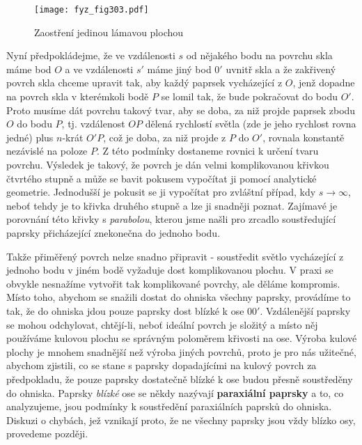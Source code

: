 {    \begin{figure}[ht!] %
      \centering
      \texttt{[image: fyz\_fig303.pdf]}
      \caption{Zaostření jedinou lámavou plochou
               \cite[s.~358]{Feynman01}}
      \label{fyz:fig303}  
    \end{figure}
    
    Nyní předpokládejme, že ve vzdálenosti \(s\) od nějakého bodu na povrchu skla máme bod \(O\) a 
    ve vzdálenosti \(s'\) máme jiný bod \(0'\) uvnitř skla a že zakřivený povrch skla chceme 
    upravit tak, aby každý paprsek vycházející z \(O\), jenž dopadne na povrch skla v kterémkoli 
    bodě \(P\) se lomil tak, že bude pokračovat do bodu \(O'\). Proto musíme dát povrchu takový 
    tvar, aby se doba, za niž projde paprsek zbodu \(O\) do bodu \(P\), tj. vzdálenost \(OP\) 
    dělená rychlostí světla (zde je jeho rychlost rovna jedné) plus \(n\)-krát \(O'P\), což je 
    doba, za niž projde z \(P\) do \(O'\), rovnala konstantě nezávislé na poloze \(P\). Z této 
    podmínky dostaneme rovnici k určení tvaru povrchu. Výsledek je takový, že povrch je dán velmi 
    komplikovanou křivkou čtvrtého stupně a může se bavit pokusem vypočítat ji pomocí analytické 
    geometrie. Jednodušší je pokusit se ji vypočítat pro zvláštní případ, kdy 
    \(s\rightarrow\infty\), neboť tehdy je to křivka druhého stupně a lze ji snadněji poznat. 
    Zajímavé je porovnání této křivky s \emph{parabolou}, kterou jsme našli pro zrcadlo 
    soustředující paprsky přicházející znekonečna do jednoho bodu.
    
    Takže přiměřený povrch nelze snadno připravit - soustředit světlo vycházející z jednoho bodu v 
    jiném bodě vyžaduje dost komplikovanou plochu. V praxi se obvykle nesnažíme vytvořit tak 
    komplikované povrchy, ale děláme kompromis. Místo toho, abychom se snažili dostat do ohniska 
    všechny paprsky, provádíme to tak, že do ohniska jdou pouze paprsky dost blízké k ose \(00'\). 
    Vzdálenější paprsky se mohou odchylovat, chtějí-li, neboť ideální povrch je složitý a místo něj 
    používáme kulovou plochu se správným poloměrem křivosti na ose. Výroba kulové plochy je mnohem 
    snadnější než výroba jiných povrchů, proto je pro nás užitečné, abychom zjistili, co se stane s 
    paprsky dopadajícími na kulový povrch za předpokladu, že pouze paprsky dostatečně blízké k ose 
    budou přesně soustředěny do ohniska. Paprsky \emph{blízké} ose se někdy nazývají 
    \textbf{paraxiální paprsky} a to, co analyzujeme, jsou podmínky k soustředění paraxiálních 
    paprsků do ohniska. Diskuzi o chybách, jež vznikají proto, že ne všechny paprsky jsou vždy 
    blízko osy, provedeme později.
    
}
